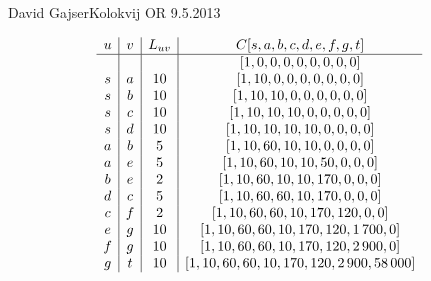 \begin{naloga}{David Gajser}{Kolokvij OR 9.5.2013}
\begin{odgovor}
\begin{tabela}
$$
\begin{array}{c|c|c|c}
u & v & L_{uv} & C[s, a, b, c, d, e, f, g, t] \\ \hline
  &   &        & [1, 0, 0, 0, 0, 0, 0, 0, 0] \\
s & a &     10 & [1, 10, 0, 0, 0, 0, 0, 0, 0] \\
s & b &     10 & [1, 10, 10, 0, 0, 0, 0, 0, 0] \\
s & c &     10 & [1, 10, 10, 10, 0, 0, 0, 0, 0] \\
s & d &     10 & [1, 10, 10, 10, 10, 0, 0, 0, 0] \\
a & b &      5 & [1, 10, 60, 10, 10, 0, 0, 0, 0] \\
a & e &      5 & [1, 10, 60, 10, 10, 50, 0, 0, 0] \\
b & e &      2 & [1, 10, 60, 10, 10, 170, 0, 0, 0] \\
d & c &      5 & [1, 10, 60, 60, 10, 170, 0, 0, 0] \\
c & f &      2 & [1, 10, 60, 60, 10, 170, 120, 0, 0] \\
e & g &     10 & [1, 10, 60, 60, 10, 170, 120, 1\,700, 0] \\
f & g &     10 & [1, 10, 60, 60, 10, 170, 120, 2\,900, 0] \\
g & t &     10 & [1, 10, 60, 60, 10, 170, 120, 2\,900, 58\,000]
\end{array}
$$
\end{tabela}
\end{odgovor}
\end{naloga}
